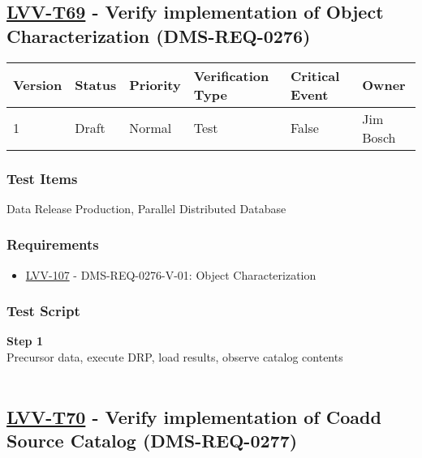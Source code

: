 \hypertarget{lvv-t69---verify-implementation-of-object-characterization-dms-req-0276}{%
\subsection{\texorpdfstring{\href{https://jira.lsstcorp.org/secure/Tests.jspa\#/testCase/LVV-T69}{LVV-T69}
- Verify implementation of Object Characterization
(DMS-REQ-0276)}{LVV-T69 - Verify implementation of Object Characterization (DMS-REQ-0276)}}\label{lvv-t69---verify-implementation-of-object-characterization-dms-req-0276}}

\begin{longtable}[]{@{}llllll@{}}
\toprule
Version & Status & Priority & Verification Type & Critical Event &
Owner\tabularnewline
\midrule
\endhead
1 & Draft & Normal & Test & False & Jim Bosch\tabularnewline
\bottomrule
\end{longtable}

\hypertarget{test-items-45}{%
\subsubsection{Test Items}\label{test-items-45}}

Data Release Production, Parallel Distributed Database~

\hypertarget{requirements-46}{%
\subsubsection{Requirements}\label{requirements-46}}

\begin{itemize}
\tightlist
\item
  \href{https://jira.lsstcorp.org/browse/LVV-107}{LVV-107} -
  DMS-REQ-0276-V-01: Object Characterization
\end{itemize}

\hypertarget{test-script-46}{%
\subsubsection{Test Script}\label{test-script-46}}

\textbf{Step 1}\\
Precursor data, execute DRP, load results, observe catalog contents\\
~\\

\hypertarget{lvv-t70---verify-implementation-of-coadd-source-catalog-dms-req-0277}{%
\subsection{\texorpdfstring{\href{https://jira.lsstcorp.org/secure/Tests.jspa\#/testCase/LVV-T70}{LVV-T70}
- Verify implementation of Coadd Source Catalog
(DMS-REQ-0277)}{LVV-T70 - Verify implementation of Coadd Source Catalog (DMS-REQ-0277)}}\label{lvv-t70---verify-implementation-of-coadd-source-catalog-dms-req-0277}}

